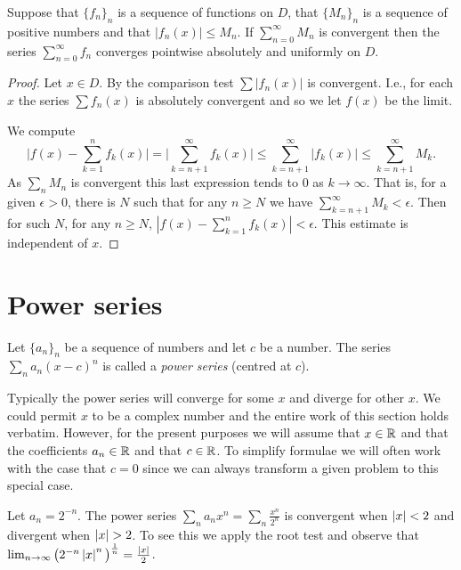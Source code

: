 \begin{theorem}
  Suppose that \({\{f_n\}}_n\) is a sequence of functions on \(D\), that \({\{M_n\}}_n\) is a sequence of positive numbers
  and that \(|f_n(x)|\leq M_n\).
  If \(\sum_{n=0}^{\infty}M_n\) is convergent then the series \(\sum_{n=0}^{\infty}f_n\) converges pointwise absolutely and uniformly on \(D\).
\end{theorem}

\begin{proof}
  Let $x \in D$.
  By the comparison test \(\sum |f_n(x)| \) is convergent.
  I.e., for each \(x\) the series \(\sum f_n(x) \) is absolutely convergent and so we let \(f(x)\) be the limit.

  We compute
  \[
    \Big|f(x) - \sum_{k=1}^{n} f_k(x)  \Big|
    =
    \Big|\sum_{k=n+1}^{\infty} f_k(x)  \Big|
    \leq \sum_{k=n+1}^{\infty} |f_k(x)|
    \leq  \sum_{k=n+1}^{\infty} M_k.
  \]
  As \(\sum_{n}M_n\) is convergent this last expression tends to \(0\) as \(k\to \infty\).
  That is, for a given $\epsilon > 0$, there is $N$ such that for any $n \ge N$ we have $\sum_{k=n+1}^\infty M_k < \epsilon$.
  Then for such $N$, for any $n \ge N$, $|f(x) - \sum_{k=1}^{n} f_k(x)| < \epsilon$.
  This estimate is independent of \(x\).
\end{proof}

\section{Power series}

\begin{definition}
  Let \({\{a_n\}}_{n}\) be a sequence of numbers and let \(c\) be a number.
  The series
  \(\sum_{n} a_n {(x-c)}^n\)
  is called a \emph{power series} (centred at \(c\)).
\end{definition}
Typically the power series will converge for some \(x\) and diverge for other \(x\).
We could permit \(x\) to be a complex number and the entire work of this section holds verbatim.
However, for the present purposes we will assume that \(x \in \mathbb{R}\) and that the coefficients \(a_n \in \mathbb{R}\) and that \(c\in \mathbb{R}\).
To simplify formulae we will often work with the case that \(c=0\) since we can always transform a given problem to this special case.

\begin{example*}
  Let \(a_n = 2^{-n}\).
  The power series \(\sum_{n} a_n x^n = \sum_{n}\frac{x^n}{2^n}\) is convergent when \(\left|x\right|<2\) and divergent  when \(\left|x\right| > 2\).
  To see this we apply the root test and observe that  \(\lim_{n\to\infty}{\big(2^{-n}\left|x\right|^n \big)}^{\frac{1}{n}}=\frac{\left|x\right|}{2}\).
\end{example*}

